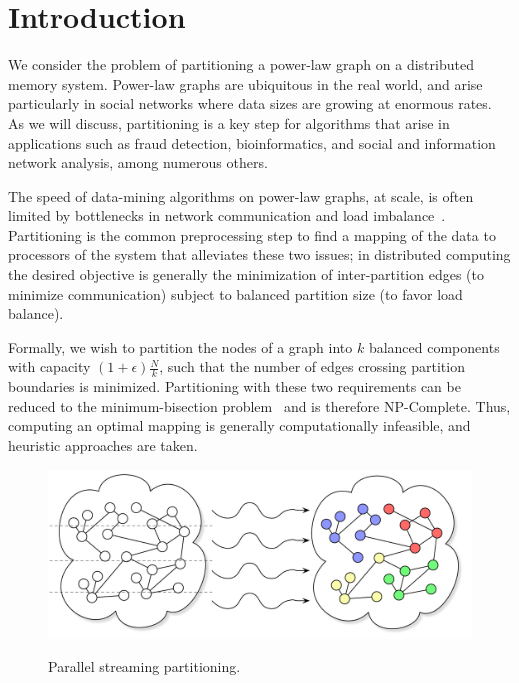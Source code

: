 \section{Introduction}
We consider the problem of partitioning a power-law graph on a distributed memory system. Power-law graphs are ubiquitous in the real world, and arise particularly in social networks where data sizes are growing at enormous rates. As we will discuss, partitioning is a key step for algorithms that arise in applications such as fraud detection, bioinformatics, and social and information network analysis, among numerous others.

The speed of data-mining algorithms on power-law graphs, at scale, is often limited by bottlenecks in network communication and load imbalance~\cite{challenglums}. Partitioning is the common preprocessing step to find a mapping of the data to processors of the system that alleviates these two issues; in distributed computing the desired objective is generally the minimization of inter-partition edges (to minimize communication) subject to balanced partition size (to favor load balance).

Formally, we wish to partition the nodes of a graph into $k$ balanced components with capacity $(1+\epsilon)\frac{N}{k}$, such that the number of edges crossing partition boundaries is minimized. Partitioning with these two requirements can be reduced to the minimum-bisection problem~\cite{Garey:1979:CIG:578533} and is therefore NP-Complete. 
Thus, computing an optimal mapping is generally computationally infeasible, and heuristic approaches are taken. 

\begin{figure}[ht]
\centering
  \includegraphics[width=0.7\columnwidth]{figures/coverfig.pdf}
  \label{fig:coverfig}
  \caption{Parallel streaming partitioning.}
\end{figure}

